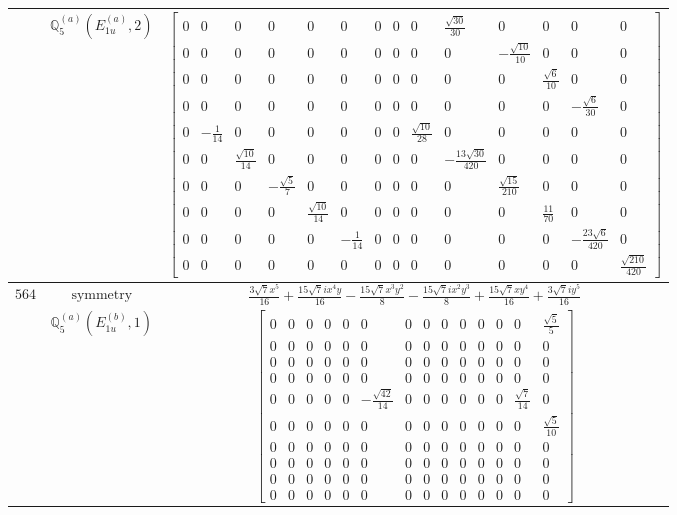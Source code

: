 \documentclass[fleqn,8pt,landscape]{jsarticle}
\begin{document}
\begin{longtable}{ccc}
$  $ & $ \mathbb{Q}_{5}^{(a)}(E_{1u}^{(a)},2) $ & $ \begin{bmatrix} 0 & 0 & 0 & 0 & 0 & 0 & 0 & 0 & 0 & \frac{\sqrt{30}}{30} & 0 & 0 & 0 & 0 \\ 0 & 0 & 0 & 0 & 0 & 0 & 0 & 0 & 0 & 0 & - \frac{\sqrt{10}}{10} & 0 & 0 & 0 \\ 0 & 0 & 0 & 0 & 0 & 0 & 0 & 0 & 0 & 0 & 0 & \frac{\sqrt{6}}{10} & 0 & 0 \\ 0 & 0 & 0 & 0 & 0 & 0 & 0 & 0 & 0 & 0 & 0 & 0 & - \frac{\sqrt{6}}{30} & 0 \\ 0 & - \frac{1}{14} & 0 & 0 & 0 & 0 & 0 & 0 & \frac{\sqrt{10}}{28} & 0 & 0 & 0 & 0 & 0 \\ 0 & 0 & \frac{\sqrt{10}}{14} & 0 & 0 & 0 & 0 & 0 & 0 & - \frac{13 \sqrt{30}}{420} & 0 & 0 & 0 & 0 \\ 0 & 0 & 0 & - \frac{\sqrt{5}}{7} & 0 & 0 & 0 & 0 & 0 & 0 & \frac{\sqrt{15}}{210} & 0 & 0 & 0 \\ 0 & 0 & 0 & 0 & \frac{\sqrt{10}}{14} & 0 & 0 & 0 & 0 & 0 & 0 & \frac{11}{70} & 0 & 0 \\ 0 & 0 & 0 & 0 & 0 & - \frac{1}{14} & 0 & 0 & 0 & 0 & 0 & 0 & - \frac{23 \sqrt{6}}{420} & 0 \\ 0 & 0 & 0 & 0 & 0 & 0 & 0 & 0 & 0 & 0 & 0 & 0 & 0 & \frac{\sqrt{210}}{420} \end{bmatrix} $ \\ \hline
$ 564 $ & $ \text{symmetry} $ & $ \frac{3 \sqrt{7} x^{5}}{16} + \frac{15 \sqrt{7} i x^{4} y}{16} - \frac{15 \sqrt{7} x^{3} y^{2}}{8} - \frac{15 \sqrt{7} i x^{2} y^{3}}{8} + \frac{15 \sqrt{7} x y^{4}}{16} + \frac{3 \sqrt{7} i y^{5}}{16} $ \\
$  $ & $ \mathbb{Q}_{5}^{(a)}(E_{1u}^{(b)},1) $ & $ \begin{bmatrix} 0 & 0 & 0 & 0 & 0 & 0 & 0 & 0 & 0 & 0 & 0 & 0 & 0 & \frac{\sqrt{5}}{5} \\ 0 & 0 & 0 & 0 & 0 & 0 & 0 & 0 & 0 & 0 & 0 & 0 & 0 & 0 \\ 0 & 0 & 0 & 0 & 0 & 0 & 0 & 0 & 0 & 0 & 0 & 0 & 0 & 0 \\ 0 & 0 & 0 & 0 & 0 & 0 & 0 & 0 & 0 & 0 & 0 & 0 & 0 & 0 \\ 0 & 0 & 0 & 0 & 0 & - \frac{\sqrt{42}}{14} & 0 & 0 & 0 & 0 & 0 & 0 & \frac{\sqrt{7}}{14} & 0 \\ 0 & 0 & 0 & 0 & 0 & 0 & 0 & 0 & 0 & 0 & 0 & 0 & 0 & \frac{\sqrt{5}}{10} \\ 0 & 0 & 0 & 0 & 0 & 0 & 0 & 0 & 0 & 0 & 0 & 0 & 0 & 0 \\ 0 & 0 & 0 & 0 & 0 & 0 & 0 & 0 & 0 & 0 & 0 & 0 & 0 & 0 \\ 0 & 0 & 0 & 0 & 0 & 0 & 0 & 0 & 0 & 0 & 0 & 0 & 0 & 0 \\ 0 & 0 & 0 & 0 & 0 & 0 & 0 & 0 & 0 & 0 & 0 & 0 & 0 & 0 \end{bmatrix} $ \\ \hline

\end{longtable}
\end{document}
